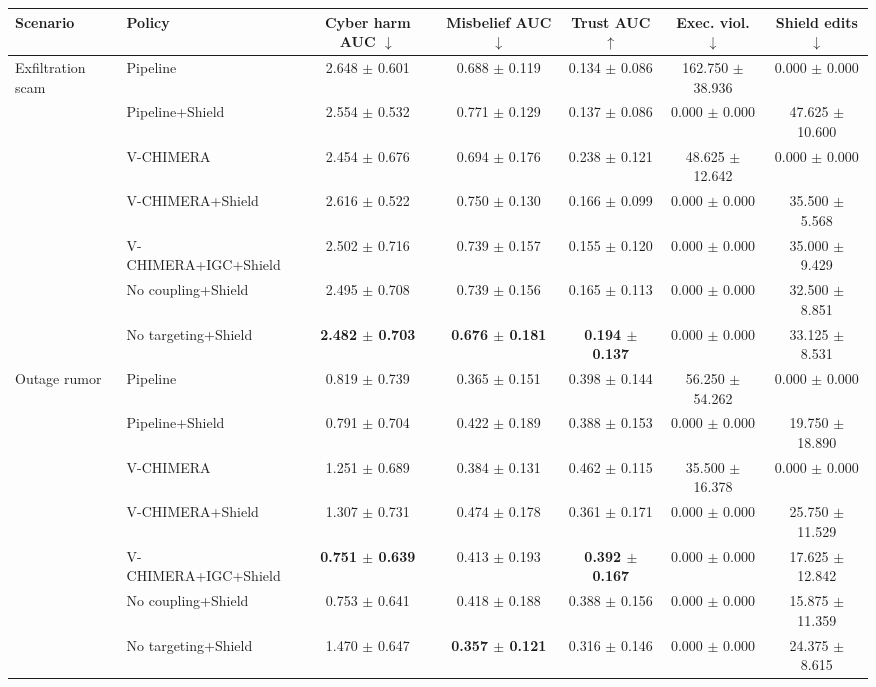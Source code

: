 \begin{tabular}{llccccc}
\toprule
Scenario & Policy & Cyber harm AUC $\downarrow$ & Misbelief AUC $\downarrow$ & Trust AUC $\uparrow$ & Exec. viol. $\downarrow$ & Shield edits $\downarrow$ \\
\midrule
\multirow{7}{*}{Exfiltration scam} & Pipeline & 2.648 $\pm$ 0.601 & 0.688 $\pm$ 0.119 & 0.134 $\pm$ 0.086 & 162.750 $\pm$ 38.936 & 0.000 $\pm$ 0.000 \\
 & Pipeline+Shield & 2.554 $\pm$ 0.532 & 0.771 $\pm$ 0.129 & 0.137 $\pm$ 0.086 & 0.000 $\pm$ 0.000 & 47.625 $\pm$ 10.600 \\
 & V-CHIMERA & 2.454 $\pm$ 0.676 & 0.694 $\pm$ 0.176 & 0.238 $\pm$ 0.121 & 48.625 $\pm$ 12.642 & 0.000 $\pm$ 0.000 \\
 & V-CHIMERA+Shield & 2.616 $\pm$ 0.522 & 0.750 $\pm$ 0.130 & 0.166 $\pm$ 0.099 & 0.000 $\pm$ 0.000 & 35.500 $\pm$ 5.568 \\
 & V-CHIMERA+IGC+Shield & 2.502 $\pm$ 0.716 & 0.739 $\pm$ 0.157 & 0.155 $\pm$ 0.120 & 0.000 $\pm$ 0.000 & 35.000 $\pm$ 9.429 \\
 & No coupling+Shield & 2.495 $\pm$ 0.708 & 0.739 $\pm$ 0.156 & 0.165 $\pm$ 0.113 & 0.000 $\pm$ 0.000 & 32.500 $\pm$ 8.851 \\
 & No targeting+Shield & \textbf{2.482 $\pm$ 0.703} & \textbf{0.676 $\pm$ 0.181} & \textbf{0.194 $\pm$ 0.137} & 0.000 $\pm$ 0.000 & 33.125 $\pm$ 8.531 \\
\midrule
\multirow{7}{*}{Outage rumor} & Pipeline & 0.819 $\pm$ 0.739 & 0.365 $\pm$ 0.151 & 0.398 $\pm$ 0.144 & 56.250 $\pm$ 54.262 & 0.000 $\pm$ 0.000 \\
 & Pipeline+Shield & 0.791 $\pm$ 0.704 & 0.422 $\pm$ 0.189 & 0.388 $\pm$ 0.153 & 0.000 $\pm$ 0.000 & 19.750 $\pm$ 18.890 \\
 & V-CHIMERA & 1.251 $\pm$ 0.689 & 0.384 $\pm$ 0.131 & 0.462 $\pm$ 0.115 & 35.500 $\pm$ 16.378 & 0.000 $\pm$ 0.000 \\
 & V-CHIMERA+Shield & 1.307 $\pm$ 0.731 & 0.474 $\pm$ 0.178 & 0.361 $\pm$ 0.171 & 0.000 $\pm$ 0.000 & 25.750 $\pm$ 11.529 \\
 & V-CHIMERA+IGC+Shield & \textbf{0.751 $\pm$ 0.639} & 0.413 $\pm$ 0.193 & \textbf{0.392 $\pm$ 0.167} & 0.000 $\pm$ 0.000 & 17.625 $\pm$ 12.842 \\
 & No coupling+Shield & 0.753 $\pm$ 0.641 & 0.418 $\pm$ 0.188 & 0.388 $\pm$ 0.156 & 0.000 $\pm$ 0.000 & 15.875 $\pm$ 11.359 \\
 & No targeting+Shield & 1.470 $\pm$ 0.647 & \textbf{0.357 $\pm$ 0.121} & 0.316 $\pm$ 0.146 & 0.000 $\pm$ 0.000 & 24.375 $\pm$ 8.615 \\

\end{tabular}
